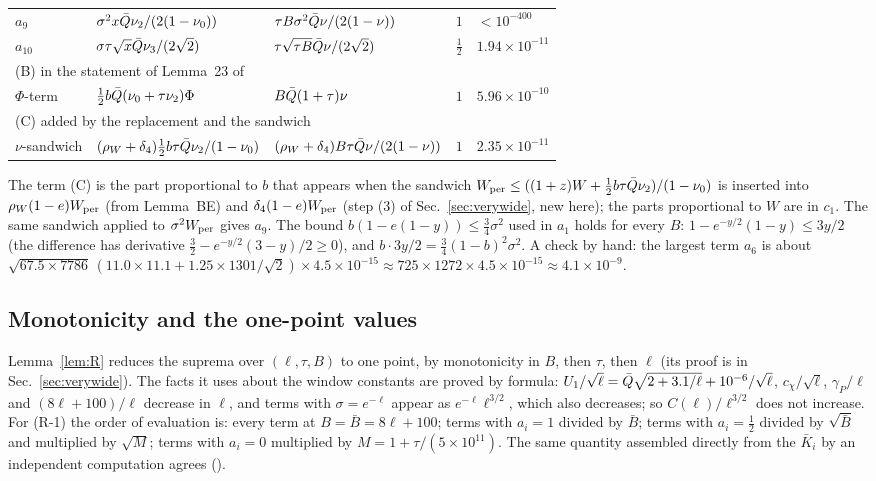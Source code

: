 \begin{table}
\begin{ruledtabular}
\begin{tabular}{p{}p{}p{}p{}p{}}
$a_9$ & $\sigma^2x\bar Q\nu_2/(2(1-\nu_0))$ & $\tau B\sigma^2\bar Q\nu/(2(1-\nu))$ & $1$ & $<10^{-400}$\\
$a_{10}$ & $\sigma\tau\sqrt x\bar Q\nu_3/(2\sqrt2)$ & $\tau\sqrt{\tau B}\bar Q\nu/(2\sqrt2)$ & $\frac12$ & $1.94\times10^{-11}$\\
\multicolumn{5}{l}{(B) in the statement of Lemma~23 of~\cite{F}}\\
$\Phi$-term & $\frac12b\bar Q(\nu_0+\tau\nu_2)\Phi$ & $B\bar Q(1+\tau)\nu$ & $1$ & $5.96\times10^{-10}$\\
\multicolumn{5}{l}{(C) added by the replacement and the sandwich}\\
$\nu$-sandwich & $(\rho_W+\delta_4)\frac12b\tau\bar Q\nu_2/(1-\nu_0)$ & $(\rho_W+\delta_4)B\tau\bar Q\nu/(2(1-\nu))$ & $1$ & $2.35\times10^{-11}$\\
\end{tabular}
\end{ruledtabular}
\end{table}

The term (C) is the part proportional to $b$ that appears when the sandwich $W_{\rm per}\le((1+z)W+\frac12b\tau\bar Q\nu_2)/(1-\nu_0)$ is inserted into $\rho_W(1-e)W_{\rm per}$ (from Lemma~BE) and $\delta_4(1-e)W_{\rm per}$ (step (3) of Sec.~\ref{sec:verywide}, new here); the parts proportional to $W$ are in $c_1$.
The same sandwich applied to $\sigma^2W_{\rm per}$ gives $a_9$.
The bound $b(1-e(1-y))\le\frac34\sigma^2$ used in $a_1$ holds for every $B$: $1-e^{-y/2}(1-y)\le3y/2$ (the difference has derivative $\frac32-e^{-y/2}(3-y)/2\ge0$), and $b\cdot3y/2=\frac34(1-b)^2\sigma^2$.
A check by hand: the largest term $a_6$ is about $\sqrt{67.5\times7786}\,(11.0\times11.1+1.25\times1301/\sqrt2)\times4.5\times10^{-15}\approx725\times1272\times4.5\times10^{-15}\approx4.1\times10^{-9}$.

\subsection{Monotonicity and the one-point values}

Lemma~\ref{lem:R} reduces the suprema over $(\ell,\tau,B)$ to one point, by monotonicity in $B$, then $\tau$, then $\ell$ (its proof is in Sec.~\ref{sec:verywide}).
The facts it uses about the window constants are proved by formula: $U_1/\sqrt\ell=\bar Q\sqrt{2+3.1/\ell}+10^{-6}/\sqrt\ell$, $c_\chi/\sqrt\ell$, $\gamma_P/\ell$ and $(8\ell+100)/\ell$ decrease in $\ell$, and terms with $\sigma=e^{-\ell}$ appear as $e^{-\ell}\ell^{3/2}$, which also decreases; so $C(\ell)/\ell^{3/2}$ does not increase.
For (R-1) the order of evaluation is: every term at $B=\bar B=8\ell+100$; terms with $a_i=1$ divided by $\bar B$; terms with $a_i=\frac12$ divided by $\sqrt{\bar B}$ and multiplied by $\sqrt M$; terms with $a_i=0$ multiplied by $M=1+\tau/(5\times10^{11})$.
The same quantity assembled directly from the $\bar K_i$ by an independent computation agrees ().

